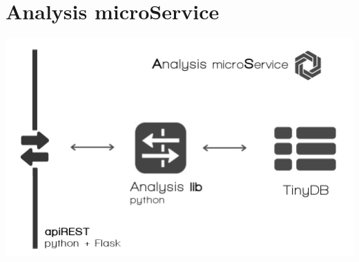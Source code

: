 \section{Analysis microService}

\begin{center}
\includegraphics[scale=0.4]{img/graphics/ams.png}
\end{center}
